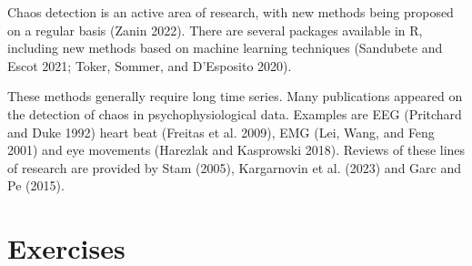 \documentclass[
  a4paper,
  DIV=11,
  numbers=noendperiod,
  oneside]{scrreprt}
\begin{document}
Chaos detection is an active area of research, with new methods being
proposed on a regular basis (Zanin 2022). There are several packages
available in R, including new methods based on machine learning
techniques (Sandubete and Escot 2021; Toker, Sommer, and D'Esposito
2020).

These methods generally require long time series. Many publications
appeared on the detection of chaos in psychophysiological data. Examples
are EEG (Pritchard and Duke 1992) heart beat (Freitas et al. 2009), EMG
(Lei, Wang, and Feng 2001) and eye movements (Harezlak and Kasprowski
2018). Reviews of these lines of research are provided by Stam (2005),
Kargarnovin et al. (2023) and Garc and Pe (2015).

\hypertarget{sec-Exercises}{%
\section{Exercises}\label{sec-Exercises}}
\end{document}
